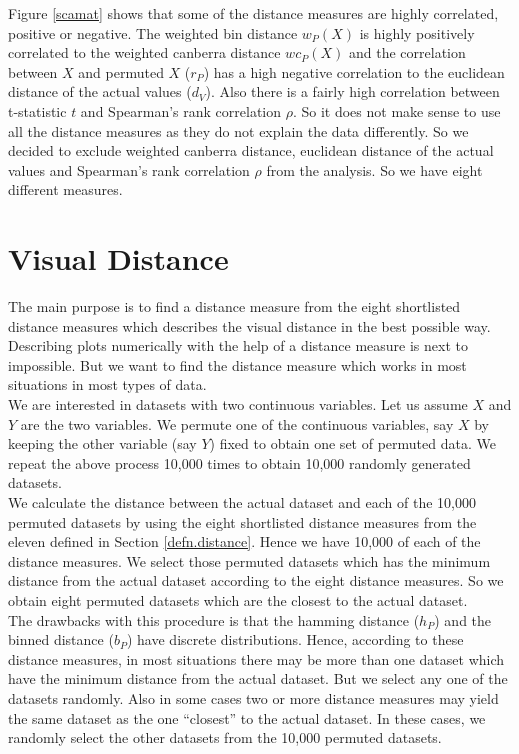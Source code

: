 Figure \ref{scamat} shows that some of the distance measures are highly correlated, positive or negative. The weighted bin distance $w_P(X)$ is highly positively correlated to the weighted canberra distance $wc_P(X)$ and the correlation between $X$ and permuted $X$ ($r_P$) has a high negative correlation to the euclidean distance of the actual values ($d_V$). Also there is a fairly high correlation between t-statistic $t$ and Spearman's rank correlation $\rho$.  So it does not make sense to use all the distance measures as they do not explain the data differently. So we decided to exclude weighted canberra distance, euclidean distance of the actual values and Spearman's rank correlation $\rho$ from the analysis. So we have eight different measures.

\section{Visual Distance}

The main purpose is to find a distance measure from the eight shortlisted distance measures which describes the visual distance in the best possible way. Describing plots numerically with the help of a distance measure is next to impossible. But we want to find the distance measure which works in most situations in most types of data. \\

We are interested in datasets with two continuous variables. Let us assume $X$ and $Y$ are the two variables.  We permute one of the continuous variables, say $X$ by keeping the other variable (say $Y$) fixed to obtain one set of permuted data. We repeat the above process 10,000 times to obtain 10,000 randomly generated datasets. \\

We calculate the distance between the actual dataset and each of the 10,000 permuted datasets by using the eight shortlisted distance measures from the eleven defined in Section \ref{defn.distance}. Hence we have 10,000 of each of the distance measures. We select those permuted datasets which has the minimum distance from the actual dataset according to the eight distance measures. So we obtain eight permuted datasets which are the closest to the actual dataset. \\

The drawbacks with this procedure is that the hamming distance ($h_P$)  and the binned distance ($b_P$) have discrete distributions. Hence, according to these distance measures, in most situations there may be more than one dataset which have the minimum distance from the actual dataset. But we select any one of the datasets randomly. Also in some cases two or more distance measures may yield the same dataset as the one ``closest'' to the actual dataset. In these cases, we randomly select the other datasets from the 10,000 permuted datasets.   \\

